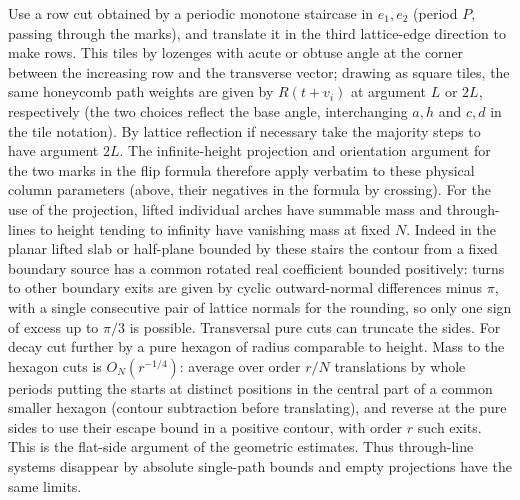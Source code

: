 

Use a row cut obtained by a periodic monotone staircase in \(e_1,e_2\) (period \(P\), passing through the marks), and translate it in the third lattice-edge direction to make rows. This tiles by lozenges with acute or obtuse angle at the corner between the increasing row and the transverse vector; drawing as square tiles, the same honeycomb path weights are given by \(R(t+v_i)\) at argument \(L\) or \(2L\), respectively (the two choices reflect the base angle, interchanging \(a,h\) and \(c,d\) in the tile notation). By lattice reflection if necessary take the majority steps to have argument \(2L\). The infinite-height projection and orientation argument for the two marks in the flip formula therefore apply verbatim to these physical column parameters (above, their negatives in the formula by crossing). For the use of the projection, lifted individual arches have summable mass and through-lines to height tending to infinity have vanishing mass at fixed \(N\). Indeed in the planar lifted slab or half-plane bounded by these stairs the contour from a fixed boundary source has a common rotated real coefficient bounded positively: turns to other boundary exits are given by cyclic outward-normal differences minus \(\pi\), with a single consecutive pair of lattice normals for the rounding, so only one sign of excess up to \(\pi/3\) is possible. Transversal pure cuts can truncate the sides. For decay cut further by a pure hexagon of radius comparable to height. Mass to the hexagon cuts is \(O_N(r^{-1/4})\): average over order \(r/N\) translations by whole periods putting the starts at distinct positions in the central part of a common smaller hexagon (contour subtraction before translating), and reverse at the pure sides to use their escape bound in a positive contour, with order \(r\) such exits. This is the flat-side argument of the geometric estimates. Thus through-line systems disappear by absolute single-path bounds and empty projections have the same limits.



